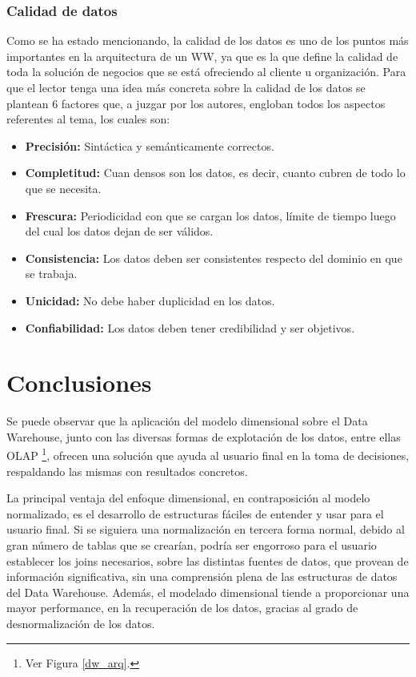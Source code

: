 \documentclass[a4paper,11pt]{article}
\begin{document}
    
    \subsubsection{Calidad de datos}
    
    Como se ha estado mencionando, la calidad de los datos es uno de los puntos más importantes en la arquitectura de un WW, ya que es la que define la calidad
    de toda la solución de negocios que se está ofreciendo al cliente u organización. Para que el lector tenga una idea más concreta sobre la calidad de los
    datos se plantean 6 factores que, a juzgar por los autores, engloban todos los aspectos referentes al tema, los cuales son:
    
    \begin{itemize}
      \item \textbf{Precisión:} Sintáctica y semánticamente correctos.
      \item \textbf{Completitud:} Cuan densos son los datos, es decir, cuanto cubren de todo lo que se necesita.
      \item \textbf{Frescura:} Periodicidad con que se cargan los datos, límite de tiempo luego del cual los datos dejan de ser válidos.
      \item \textbf{Consistencia:} Los datos deben ser consistentes respecto del dominio en que se trabaja.
      \item \textbf{Unicidad:} No debe haber duplicidad en los datos.
      \item \textbf{Confiabilidad:} Los datos deben tener credibilidad y ser objetivos.
    \end{itemize}
  
  

  \section{Conclusiones} \label{conclusiones}
  
  Se puede observar que la aplicación del modelo dimensional sobre el Data Warehouse, junto con las diversas formas de explotación de los datos, entre ellas
  OLAP \footnote{Ver Figura \ref{dw_arq}.}, ofrecen una solución que ayuda al usuario final en la toma de decisiones, respaldando las mismas con resultados concretos.
  
  La principal ventaja del enfoque dimensional, en contraposición al modelo normalizado, es el desarrollo de estructuras fáciles de entender y usar para el
  usuario final. Si se siguiera una normalización en tercera forma normal, debido al gran número de tablas que se crearían, podría ser engorroso para el
  usuario establecer los joins necesarios, sobre las distintas fuentes de datos, que provean de información significativa, sin una comprensión plena
  de las estructuras de datos del Data Warehouse.
  Además, el modelado dimensional tiende a proporcionar una mayor performance, en la recuperación de los datos, gracias al grado de desnormalización de los datos.
  
\end{document}

